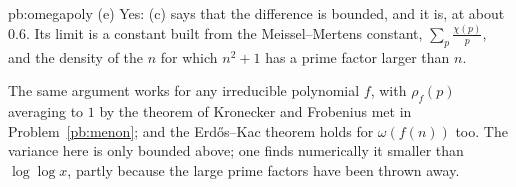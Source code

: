 \begin{solution}{pb:omegapoly}
(e) Yes: (c) says that the difference is bounded, and it is, at about $0.6$. Its limit is a constant built from the Meissel--Mertens constant, $\sum_p\frac{\chi(p)}p$, and the
density of the $n$ for which $n^2+1$ has a prime factor larger than $n$.

\leads The same argument works for any irreducible polynomial $f$, with $\rho_f(p)$ averaging to $1$ by the theorem of Kronecker and Frobenius met in Problem~\ref{pb:menon}; and the
Erd\H os--Kac theorem holds for $\omega(f(n))$ too. The variance here is only bounded above; one finds numerically it smaller than $\log\log x$, partly because the large prime factors
have been thrown away.
\end{solution}

